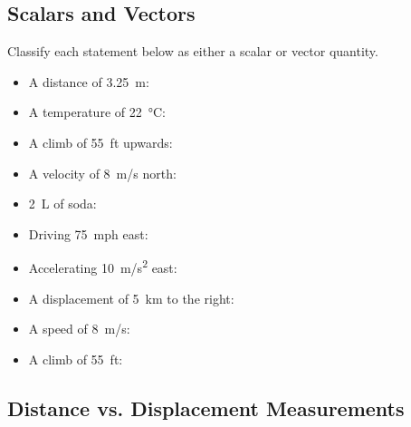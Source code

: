\documentclass[answers]{exam}
\begin{document}
\subsection{Scalars and Vectors}

\begin{questions}
\question 
Classify each statement below as either a scalar or vector quantity.

\begin{itemize}
    \item A distance of \SI{3.25}{m}: \fillin[scalar][2cm]
    \item A temperature of \SI{22}{\degreeCelsius}: \fillin[scalar][2cm]
    \item A climb of \SI{55}{ft} upwards: \fillin[vector][2cm]
    \item A velocity of \SI{8}{m/s} north: \fillin[vector][2cm]
    \item \SI{2}{L} of soda: \fillin[scalar][2cm]
    \item Driving \SI{75}{mph} east: \fillin[vector][2cm]
    \item Accelerating \SI{10}{m/s^2} east: \fillin[vector][2cm]
    \item A displacement of \SI{5}{km} to the right: \fillin[vector][2cm]
    \item A speed of \SI{8}{m/s}: \fillin[scalar][2cm]
    \item A climb of \SI{55}{ft}: \fillin[scalar][2cm]
\end{itemize}
\end{questions}

\subsection{Distance vs. Displacement Measurements}
\end{document}
